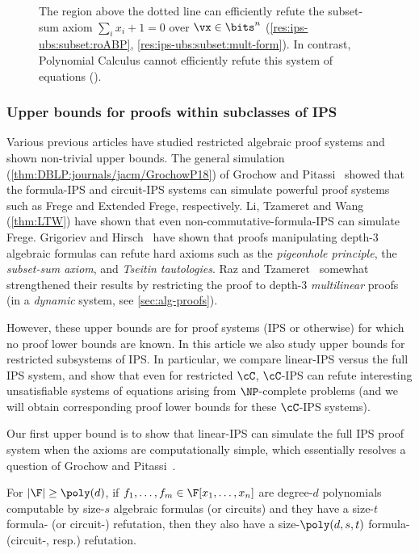 \documentclass{toc}
\begin{document}
\begin{figure}
{\begin{enumerate*}[(a)]
                                \label{fig:results:lbs}
                        \item The region above the dotted line can efficiently refute the subset-sum axiom $\sum_i x_i+1=0$ over $\vx\in\bits^n$ (\autoref{res:ips-ubs:subset:roABP}, \autoref{res:ips-ubs:subset:mult-form}). In contrast, Polynomial Calculus cannot efficiently refute this system of equations (\cite{IPS99}).
                                \label{fig:results:ubs}
                \end{enumerate*}
        }
\end{figure}

\subsubsection{Upper bounds for proofs within subclasses of IPS}\label{sec:results:upper}

Various previous %
%
%
%
%
articles %
%
%
have studied restricted algebraic proof systems and shown non-trivial upper bounds.  The general simulation (\autoref{thm:DBLP:journals/jacm/GrochowP18}) of Grochow and Pitassi~\cite{DBLP:journals/jacm/GrochowP18} showed that the formula-IPS and circuit-IPS systems can simulate powerful proof systems such as Frege and Extended Frege, respectively.  %
%
%
%
Li, Tzameret and Wang~\cite{LiTW15} (\autoref{thm:LTW})
%
have shown  %
%
that even non-commutative-formula-IPS can simulate Frege.
Grigoriev and Hirsch~\cite{GrigorievHirsch03}
%
have shown   %
that proofs manipulating depth-3 algebraic formulas can refute hard axioms such as the \emph{pigeonhole principle}, the \emph{subset-sum axiom}, and \emph{Tseitin tautologies}.
Raz and Tzameret~\cite{RazTzameret08a,RazTzameret08b} somewhat strengthened their results by restricting the proof to depth-3 \emph{multilinear} proofs (in a \emph{dynamic} system, see \autoref{sec:alg-proofs}).

However, these upper bounds are for proof systems (IPS or otherwise) for which no proof lower bounds are known.  In this article
we also study upper bounds for restricted subsystems of IPS.  In particular, we compare linear-IPS versus the full IPS system, and show
that even for restricted $\cC$, $\cC$-IPS can refute interesting unsatisfiable systems of equations arising from $\NP$-complete problems (and we will obtain corresponding proof lower bounds for these $\cC$-IPS systems).

Our first upper bound is to show that linear-IPS can simulate the full IPS proof system when the axioms are computationally simple, which essentially resolves a question of Grochow and Pitassi~\cite[Open Question 1.13\footnote{This refers to the following version: \url{http://arxiv.org/abs/1404.3820v1}.}]{DBLP:journals/jacm/GrochowP18}.
\begin{theorem}
  For $|\F|\ge\poly(d)$, if $f_1,\ldots,f_m\in\F[x_1,\ldots,x_n]$ are degree-$d$ polynomials computable by size-$s$ algebraic formulas
%
(or circuits)  %
and they have a size-$t$ formula-\IPS
%
(or circuit-\IPS)  %
refutation, then they also have a size-$\poly(d,s,t)$ formula-\lIPS
%
(circuit-\lIPS, resp.)
refutation.
\end{theorem}
%
%
%
%
%
\end{document}
